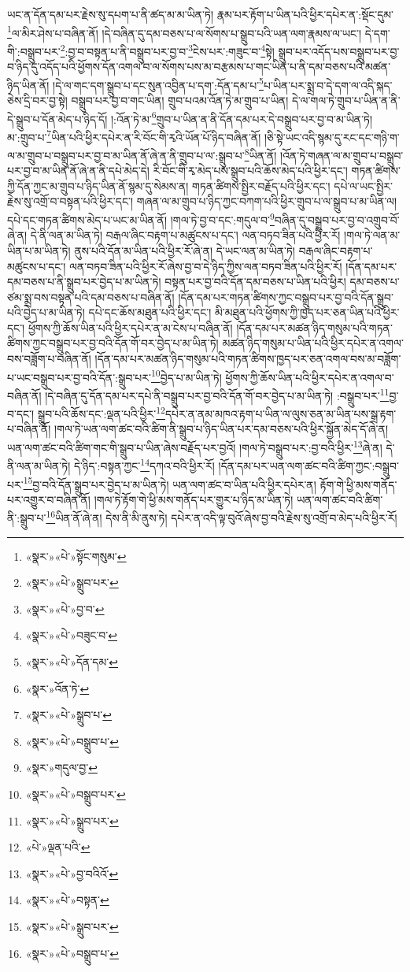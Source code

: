 ཡང་ན་དོན་དམ་པར་རྗེས་སུ་དཔག་པ་ནི་ཚད་མ་མ་ཡིན་ཏེ། རྣམ་པར་རྟོག་པ་ཡིན་པའི་ཕྱིར་དཔེར་ན་:སྡོང་དུམ་\footnote{«སྣར་»«པེ་»སྟོང་གསུམ་}ལ་མིར་ཤེས་པ་བཞིན་ནོ། །དེ་བཞིན་དུ་དམ་བཅས་པ་ལ་སོགས་པ་སྒྲུབ་པའི་ཡན་ལག་རྣམས་ལ་ཡང་། དེ་དག་གི་:བསྒྲུབ་པར་\footnote{«སྣར་»«པེ་»སྒྲུབ་པར་}:བྱ་བ་བསྟན་པ་ནི་བསྒྲུབ་པར་བྱ་བ་\footnote{«སྣར་»«པེ་»བྱ་བ་}ངེས་པར་:གཟུང་བ་\footnote{«སྣར་»«པེ་»བཟུང་བ་}སྟེ། སྒྲུབ་པར་འདོད་པས་བསྒྲུབ་པར་བྱ་བ་ཉིད་དུ་འདོད་པའི་ཕྱོགས་དོན་འགལ་བ་ལ་སོགས་པས་མ་བརྩམས་པ་གང་ཡིན་པ་ནི་དམ་བཅས་པའི་མཚན་ཉིད་ཡིན་ནོ། །དེ་ལ་གང་དག་སྒྲུབ་པ་དང་སུན་འབྱིན་པ་དག་:དོན་དམ་པ་\footnote{«སྣར་»«པེ་»དོན་དམ་}པ་ཡིན་པར་སྨྲ་བ་དེ་དག་ལ་འདི་སྐད་ཅེས་དྲི་བར་བྱ་སྟེ། བསྒྲུབ་པར་བྱ་བ་གང་ཡིན། གྲུབ་པའམ་འོན་ཏེ་མ་གྲུབ་པ་ཡིན། དེ་ལ་གལ་ཏེ་གྲུབ་པ་ཡིན་ན་ནི་དེ་སྒྲུབ་པ་དོན་མེད་པ་ཉིད་དོ། །:འོན་ཏེ་མ་\footnote{«སྣར་»འོན་ཏེ་}གྲུབ་པ་ཡིན་ན་ནི་དོན་དམ་པར་དེ་བསྒྲུབ་པར་བྱ་བ་མ་ཡིན་ཏེ། མ་:གྲུབ་པ་\footnote{«སྣར་»«པེ་»སྒྲུབ་པ་}ཡིན་པའི་ཕྱིར་དཔེར་ན་རི་བོང་གི་རྭའི་ཡོན་པོ་ཉིད་བཞིན་ནོ། །ཅི་སྟེ་ཡང་འདི་སྙམ་དུ་རང་དང་གཉི་ག་ལ་མ་གྲུབ་པ་བསྒྲུབ་པར་བྱ་བ་མ་ཡིན་ནོ་ཞེ་ན་ནི་གྲུབ་པ་ལ་:སྒྲུབ་པ་\footnote{«སྣར་»«པེ་»བསྒྲུབ་པ་}ཡིན་ནོ། །འོན་ཏེ་གཞན་ལ་མ་གྲུབ་པ་བསྒྲུབ་པར་བྱ་བ་མ་ཡིན་ནོ་ཞེ་ན་ནི་དཔེ་མེད་དེ། རི་བོང་གི་རྭ་མེད་པས་སྒྲུབ་པའི་ཆོས་མེད་པའི་ཕྱིར་དང་། གཏན་ཚིགས་ཀྱི་དོན་ཀྱང་མ་གྲུབ་པ་ཉིད་ཡིན་ནོ་སྙམ་དུ་སེམས་ན། གཏན་ཚིགས་སྤྱིར་བརྗོད་པའི་ཕྱིར་དང་། དཔེ་ལ་ཡང་སྤྱིར་རྗེས་སུ་འགྲོ་བ་བསྟན་པའི་ཕྱིར་དང་། གཞན་ལ་མ་གྲུབ་པ་ཉིད་ཀྱང་བཀག་པའི་ཕྱིར་གྲུབ་པ་ལ་སྒྲུབ་པ་མ་ཡིན་ལ། དཔེ་དང་གཏན་ཚིགས་མེད་པ་ཡང་མ་ཡིན་ནོ། །གལ་ཏེ་བྱ་བ་དང་:གདུལ་བ་\footnote{«སྣར་»གདུལ་བྱ་}བཞིན་དུ་བསྒྲུབ་པར་བྱ་བ་འགྲུབ་བོ་ཞེ་ན། དེ་ནི་ལན་མ་ཡིན་ཏེ། བརྒལ་ཞིང་བརྟག་པ་མཚུངས་པ་དང་། ལན་བཏབ་ཟིན་པའི་ཕྱིར་རོ། །གལ་ཏེ་ལན་མ་ཡིན་པ་མ་ཡིན་ཏེ། ནུས་པའི་དོན་མ་ཡིན་པའི་ཕྱིར་རོ་ཞེ་ན། དེ་ཡང་ལན་མ་ཡིན་ཏེ། བརྒལ་ཞིང་བརྟག་པ་མཚུངས་པ་དང་། ལན་བཏབ་ཟིན་པའི་ཕྱིར་རོ་ཞེས་བྱ་བ་དེ་ཉིད་ཀྱིས་ལན་བཏབ་ཟིན་པའི་ཕྱིར་རོ། །དོན་དམ་པར་དམ་བཅས་པ་ནི་སྒྲུབ་པར་བྱེད་པ་མ་ཡིན་ཏེ། བསྟན་པར་བྱ་བའི་དོན་དམ་བཅས་པ་ཡིན་པའི་ཕྱིར། དམ་བཅས་པ་ཙམ་སྨྲ་བས་བསྟན་པའི་དམ་བཅས་པ་བཞིན་ནོ། །དོན་དམ་པར་གཏན་ཚིགས་ཀྱང་བསྒྲུབ་པར་བྱ་བའི་དོན་སྒྲུབ་པའི་བྱེད་པ་མ་ཡིན་ཏེ། དཔེ་དང་ཆོས་མཐུན་པའི་ཕྱིར་དང་། མི་མཐུན་པའི་ཕྱོགས་ཀྱི་ཁྱད་པར་ཅན་ཡིན་པའི་ཕྱིར་དང་། ཕྱོགས་ཀྱི་ཆོས་ཡིན་པའི་ཕྱིར་དཔེར་ན་མ་ངེས་པ་བཞིན་ནོ། །དོན་དམ་པར་མཚན་ཉིད་གསུམ་པའི་གཏན་ཚིགས་ཀྱང་བསྒྲུབ་པར་བྱ་བའི་དོན་གོ་བར་བྱེད་པ་མ་ཡིན་ཏེ། མཚན་ཉིད་གསུམ་པ་ཡིན་པའི་ཕྱིར་དཔེར་ན་འགལ་བས་བཟློག་པ་བཞིན་ནོ། །དོན་དམ་པར་མཚན་ཉིད་གསུམ་པའི་གཏན་ཚིགས་ཁྱད་པར་ཅན་འགལ་བས་མ་བཟློག་པ་ཡང་བསྒྲུབ་པར་བྱ་བའི་དོན་:སྒྲུབ་པར་\footnote{«སྣར་»«པེ་»བསྒྲུབ་པར་}བྱེད་པ་མ་ཡིན་ཏེ། ཕྱོགས་ཀྱི་ཆོས་ཡིན་པའི་ཕྱིར་དཔེར་ན་འགལ་བ་བཞིན་ནོ། །དེ་བཞིན་དུ་དོན་དམ་པར་དཔེ་ནི་བསྒྲུབ་པར་བྱ་བའི་དོན་གོ་བར་བྱེད་པ་མ་ཡིན་ཏེ། :བསྒྲུབ་པར་\footnote{«སྣར་»«པེ་»སྒྲུབ་པར་}བྱ་བ་དང་། སྒྲུབ་པའི་ཆོས་དང་:ལྡན་པའི་ཕྱིར་\footnote{«པེ་»ལྡན་པའི་}དཔེར་ན་ནམ་མཁའ་རྟག་པ་ཡིན་ལ་ལུས་ཅན་མ་ཡིན་པས་སྒྲ་རྟག་པ་བཞིན་ནོ། །གལ་ཏེ་ཡན་ལག་ཚང་བའི་ཚིག་ནི་སྒྲུབ་པ་ཉིད་ཡིན་པར་དམ་བཅས་པའི་ཕྱིར་སྐྱོན་མེད་དོ་ཞེ་ན། ཡན་ལག་ཚང་བའི་ཚིག་གང་གི་སྒྲུབ་པ་ཡིན་ཞེས་བརྗོད་པར་བྱའོ། །གལ་ཏེ་བསྒྲུབ་པར་:བྱ་བའི་ཕྱིར་\footnote{«སྣར་»«པེ་»བྱ་བའིའོ་}ཞེ་ན། དེ་ནི་ལན་མ་ཡིན་ཏེ། དེ་ཉིད་:བསྟན་ཀྱང་\footnote{«སྣར་»«པེ་»བསྟན་}དཀའ་བའི་ཕྱིར་རོ། །དོན་དམ་པར་ཡན་ལག་ཚང་བའི་ཚིག་ཀྱང་:བསྒྲུབ་པར་\footnote{«སྣར་»«པེ་»སྒྲུབ་པར་}བྱ་བའི་དོན་སྒྲུབ་པར་བྱེད་པ་མ་ཡིན་ཏེ། ཡན་ལག་ཚང་བ་ཡིན་པའི་ཕྱིར་དཔེར་ན། རྟོག་གེ་ཕྱི་མས་གནོད་པར་འགྱུར་བ་བཞིན་ནོ། །གལ་ཏེ་རྟོག་གེ་ཕྱི་མས་གནོད་པར་གྱུར་པ་ཉིད་མ་ཡིན་ཏེ། ཡན་ལག་ཚང་བའི་ཚིག་ནི་:སྒྲུབ་པ་\footnote{«སྣར་»«པེ་»བསྒྲུབ་པ་}ཡིན་ནོ་ཞེ་ན། དེས་ནི་མི་ནུས་ཏེ། དཔེར་ན་འདི་ལྟ་བུའོ་ཞེས་བྱ་བའི་རྗེས་སུ་འགྲོ་བ་མེད་པའི་ཕྱིར་རོ། 